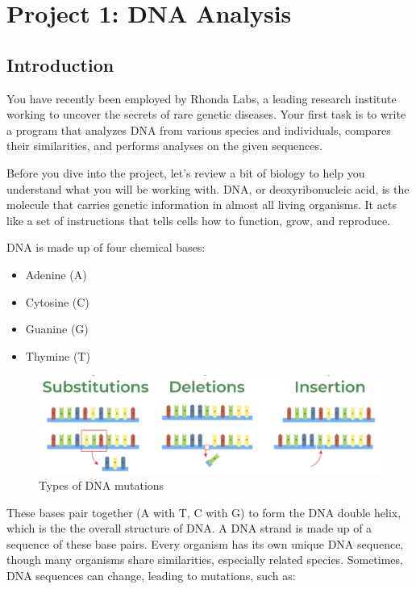 \chapter*{Project 1: DNA Analysis}
\setcounter{chapter}{7}
\setcounter{section}{0}


\section{Introduction}
You have recently been employed by Rhonda Labs, a leading research institute working to uncover the secrets of rare genetic diseases. Your first task is to write a program that analyzes DNA from various species and individuals, compares their similarities, and performs analyses on the given sequences.


Before you dive into the project, let's review a bit of biology to help you understand what you will be working with. DNA, or deoxyribonucleic acid, is the molecule that carries genetic information in almost all living organisms. It acts like a set of instructions that tells cells how to function, grow, and reproduce.

DNA is made up of four chemical bases:
\begin{itemize}[left=1cm]
    \item Adenine (A)
    \item Cytosine (C)
    \item Guanine (G)
    \item Thymine (T)
\end{itemize}

\begin{figure}[htp]
    \centering
    \includegraphics[width=12cm]{images/project1/newMutationsImg.png}
    \caption{Types of DNA mutations}
    \label{fig:galaxy}
\end{figure}

These bases pair together (A with T, C with G) to form the DNA double helix, which is the the overall structure of DNA. A DNA strand is made up of a sequence of these base pairs. Every organism has its own unique DNA sequence, though many organisms share similarities, especially related species. Sometimes, DNA sequences can change, leading to mutations, such as:

